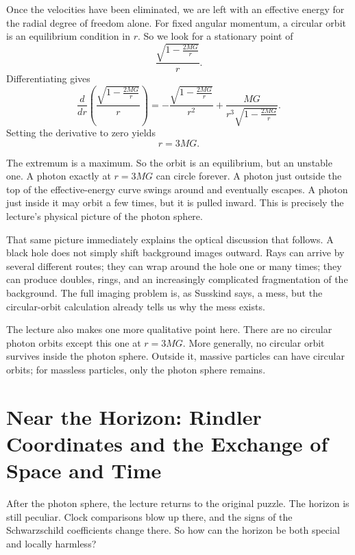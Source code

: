 Once the velocities have been eliminated, we are left with an effective energy for the radial degree of freedom alone. For fixed angular momentum, a circular orbit is an equilibrium condition in \(r\). So we look for a stationary point of
\begin{equation}
\frac{\sqrt{1-\frac{2MG}{r}}}{r}.
\end{equation}
Differentiating gives
\begin{equation}
\frac{d}{dr}
\left(
\frac{\sqrt{1-\frac{2MG}{r}}}{r}
\right)
=
-\frac{\sqrt{1-\frac{2MG}{r}}}{r^{2}}
+
\frac{MG}{r^{3}\sqrt{1-\frac{2MG}{r}}}.
\end{equation}
Setting the derivative to zero yields
\begin{equation}
r=3MG.
\end{equation}

The extremum is a maximum. So the orbit is an equilibrium, but an unstable one. A photon exactly at \(r=3MG\) can circle forever. A photon just outside the top of the effective-energy curve swings around and eventually escapes. A photon just inside it may orbit a few times, but it is pulled inward. This is precisely the lecture's physical picture of the photon sphere.

That same picture immediately explains the optical discussion that follows. A black hole does not simply shift background images outward. Rays can arrive by several different routes; they can wrap around the hole one or many times; they can produce doubles, rings, and an increasingly complicated fragmentation of the background. The full imaging problem is, as Susskind says, a mess, but the circular-orbit calculation already tells us why the mess exists.

The lecture also makes one more qualitative point here. There are no circular photon orbits except this one at \(r=3MG\). More generally, no circular orbit survives inside the photon sphere. Outside it, massive particles can have circular orbits; for massless particles, only the photon sphere remains.

\section{Near the Horizon: Rindler Coordinates and the Exchange of Space and Time}

After the photon sphere, the lecture returns to the original puzzle. The horizon is still peculiar. Clock comparisons blow up there, and the signs of the Schwarzschild coefficients change there. So how can the horizon be both special and locally harmless?

